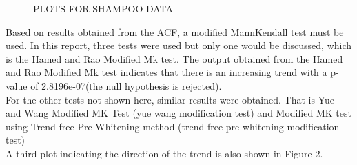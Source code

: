 \documentclass[11]{article}
\begin{document}
\begin{figure}
	    \qquad                                                                                                                                              \caption{PLOTS FOR SHAMPOO DATA}                                                                                             \label{fig:2}
\end{figure}
Based on results obtained from the ACF, a modified MannKendall test must be used. In this report, three tests were used but only one would be discussed, which is the Hamed and Rao Modified Mk test. 
The output obtained from the Hamed and Rao Modified Mk test indicates that there is an increasing trend with a p-value of 2.8196e-07(the null hypothesis is rejected).\\ For the other tests not shown here, similar results were obtained. That is Yue and Wang Modified MK Test (yue wang modification test) and Modified MK test using Trend free Pre-Whitening method (trend free pre whitening modification test)\\A third plot indicating the direction of the trend is also shown in Figure 2.\\
\end{document}
